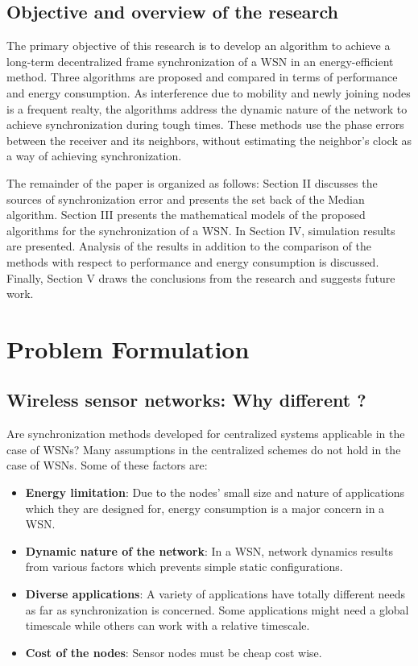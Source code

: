\documentclass[journal]{IEEEtran}
\begin{document}
\subsection{\textbf{Objective and overview of the research}}
The primary objective of this research is to develop an algorithm to
achieve a long-term decentralized frame synchronization of a WSN in
an energy-efficient method. Three algorithms are proposed and
compared in terms of performance and energy consumption. As
interference due to mobility and newly joining nodes is a frequent
realty, the algorithms address the dynamic nature of the network to
achieve synchronization during tough times. These methods use the
phase errors between the receiver and its neighbors, without
estimating the neighbor's clock as a way of achieving
synchronization.
\par The remainder of the paper is organized as follows:
Section II discusses the sources of synchronization error and
presents the set back of the Median algorithm. Section III presents
the mathematical models of the proposed algorithms for the
synchronization of a WSN. In Section IV, simulation results are
presented. Analysis of the results in addition to the comparison of
the methods with respect to performance and energy consumption is
discussed. Finally, Section V draws the conclusions from the
research and suggests future work.
\section{\textbf{Problem Formulation}}
\subsection{\textbf{Wireless sensor networks: Why different ?}}
Are synchronization methods developed for centralized systems applicable in the case of WSNs? Many
assumptions in the centralized schemes do not hold in the case
of WSNs. Some of these factors are:
\begin{itemize}
\item \textbf{Energy limitation}: Due to the nodes' small size and nature of applications which they
are designed for, energy consumption is a major concern in a WSN.
\item \textbf{Dynamic nature of the network}: In a WSN, network
dynamics results from various factors which prevents simple
static configurations.
\item \textbf{Diverse applications}: A variety of applications
have totally different needs as far as synchronization is concerned.
Some applications might need a global timescale while
others can work with a relative timescale.
\item \textbf{Cost of the nodes}: Sensor nodes must be cheap cost wise.
\end{itemize}
\end{document}
